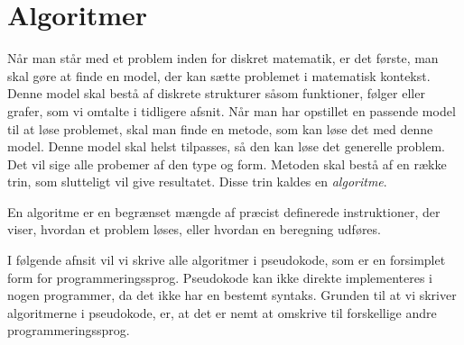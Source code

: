 \chapter{Algoritmer} \label{kap.algo}
Når man står med et problem inden for diskret matematik, er det første, man skal gøre at finde en model, der kan sætte problemet i matematisk kontekst. Denne model skal bestå af diskrete strukturer såsom funktioner, følger eller grafer, som vi omtalte i tidligere afsnit. Når man har opstillet en passende model til at løse problemet, skal man finde en metode, som kan løse det med denne model. Denne model skal helst tilpasses, så den kan løse det generelle problem. Det vil sige alle probemer af den type og form. Metoden skal bestå af en række trin, som slutteligt vil give resultatet. Disse trin kaldes en \emph{algoritme}. 
\begin{defn}
[Algoritmer] En algoritme er en begrænset mængde af præcist definerede instruktioner, der viser, hvordan et problem løses, eller hvordan en beregning udføres. 
\end{defn}
I følgende afnsit vil vi skrive alle algoritmer i pseudokode, som er en forsimplet form for programmeringssprog. Pseudokode kan ikke direkte implementeres i nogen programmer, da det ikke har en bestemt syntaks. Grunden til at vi skriver algoritmerne i pseudokode, er, at det er nemt at omskrive til forskellige andre programmeringssprog.





